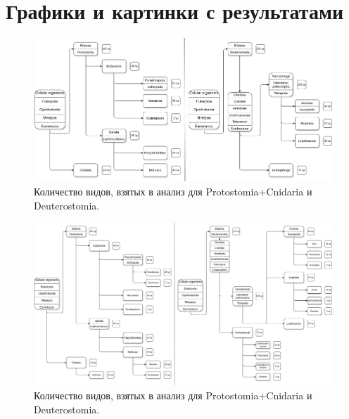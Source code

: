\newpage
\section{Графики и картинки с результатами}

\begin{figure}[h] %
    \centering
    \includegraphics[width=1.0\textwidth]{images/Tree_summary}
    \caption{Количество видов, взятых в анализ для Protostomia+Cnidaria и Deuterostomia.}
    \label{fig:tree_1}
\end{figure}

\newpage
\begin{figure}[h] %
    \centering
    \includegraphics[width=1.0\textwidth]{images/Tree_summary_v2}
    \caption{Количество видов, взятых в анализ для Protostomia+Cnidaria и Deuterostomia.}
    \label{fig:tree_2}
\end{figure}

